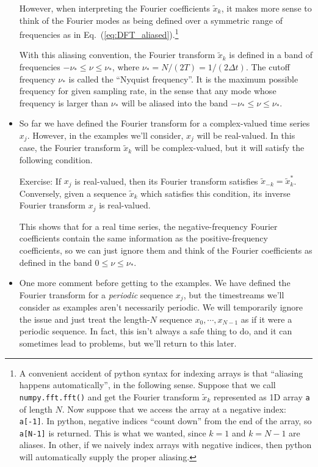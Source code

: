 \documentclass[aps,prd,superscriptaddress,groupedaddress,nofootinbib,nobibnotes]{revtex4}
\def\tx{{\tilde x}}
\begin{document}
\begin{itemize}
 However, when interpreting the Fourier coefficients $\tx_k$, it makes more sense to think of
 the Fourier modes as being defined over a symmetric range of frequencies as 
 in Eq.~(\ref{eq:DFT_aliased}).\footnote{A convenient accident of python syntax for indexing
   arrays is that ``aliasing happens automatically'', in the following sense.
   Suppose that we call {\tt numpy.fft.fft()} and get the Fourier transform $\tx_k$ represented
   as 1D array {\tt a} of length $N$.  Now suppose that we access the array at a negative index: {\tt a[-1]}.
   In python, negative indices ``count down'' from the end of the array, so {\tt a[N-1]} is returned.
   This is what we wanted, since $k=1$ and $k=N-1$ are aliases.  In other, if we naively index
   arrays with negative indices, then python will automatically supply the proper aliasing.}

 With this aliasing convention, the Fourier transform $\tx_k$ is defined in a band of frequencies 
 $-\nu_* \le \nu \le \nu_*$, where $\nu_* = N / (2 T) = 1 / (2 \Delta t)$.  
 The cutoff frequency $\nu_*$ is called the ``Nyquist frequency''.
 It is the maximum possible frequency for given sampling rate, in the sense that any mode whose
 frequency is larger than $\nu_*$ will be aliased into the band $-\nu_* \le \nu \le \nu_*$.

\item So far we have defined the Fourier transform for a complex-valued time series $x_j$.
 However, in the examples we'll consider, $x_j$ will be real-valued.  In this case, the Fourier
 transform $\tx_k$ will be complex-valued, but it will satisfy the following condition.

 Exercise: If $x_j$ is real-valued, then its Fourier transform satisfies $\tx_{-k} = \tx_k^*$.
 Conversely, given a sequence $\tx_k$ which satisfies this condition, its inverse Fourier transform
 $x_j$ is real-valued.

 This shows that for a real time series, the negative-frequency Fourier coefficients contain the same information
 as the positive-frequency coefficients, so we can just ignore them and think of the Fourier coefficients as
 defined in the band $0 \le \nu \le \nu_*$.

\item One more comment before getting to the examples.  We have defined the Fourier transform for a {\em periodic}
 sequence $x_j$, but the timestreams we'll consider as examples aren't necessarily periodic.
 We will temporarily ignore the issue and just treat the length-$N$ sequence $x_0, \cdots, x_{N-1}$
 as if it were a periodic sequence.  In fact, this isn't always a safe thing to do, and it can
 sometimes lead to problems, but we'll return to this later.


\end{itemize}
\end{document}
